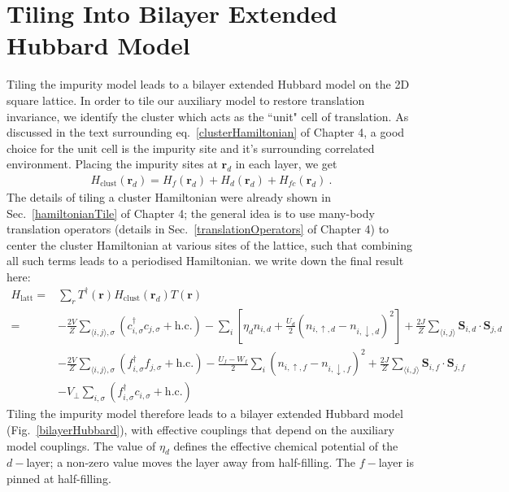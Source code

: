 \section{Tiling Into Bilayer Extended Hubbard Model}
Tiling the impurity model leads to a bilayer extended Hubbard model on the 2D square lattice. In order to tile our auxiliary model to restore translation invariance, we identify the cluster which acts as the ``unit" cell of translation. As discussed in the text surrounding eq.~\ref{clusterHamiltonian} of Chapter 4, a good choice for the unit cell is the impurity site and it's surrounding correlated environment. Placing the impurity sites at \(\bm r_d\) in each layer, we get
\begin{equation}\begin{aligned}
	H_\text{clust}(\bm r_d) = H_f(\bm r_d) + H_d(\bm r_d) + H_{fc}(\bm r_d)~.
\end{aligned}\end{equation}
The details of tiling a cluster Hamiltonian were already shown in Sec.~\ref{hamiltonianTile} of Chapter 4; the general idea is to use many-body translation operators (details in Sec.~\ref{translationOperators} of Chapter 4) to center the cluster Hamiltonian at various sites of the lattice, such that combining all such terms leads to a periodised Hamiltonian. we write down the final result here:
\begin{equation}\begin{aligned}
	H_\text{latt} =& \sum_r T^\dagger(\bm r) H_\text{clust}(\bm r_d) T(\bm r)\\
	=& -\frac{2V}{Z}\sum_{\langle i,j \rangle ,\sigma}\left(c^\dagger_{i,\sigma}c_{j,\sigma} + \text{h.c.}\right) - \sum_i \left[\eta_d n_{i,d} + \frac{U_d}{2}(n_{i,\uparrow,d} - n_{i,\downarrow,d})^2\right] + \frac{2J}{Z}\sum_{\langle i,j \rangle}{\bm S}_{i,d}\cdot{\bm S}_{j,d}\\
				   & -\frac{2V}{Z}\sum_{\langle i,j \rangle ,\sigma}\left(f^\dagger_{i,\sigma}f_{j,\sigma} + \text{h.c.}\right) - \frac{U_f - W_f}{2}\sum_i \left(n_{i,\uparrow,f} - n_{i,\downarrow,f}\right)^2 + \frac{2J}{Z} \sum_{\langle i,j \rangle}{\bm S}_{i,f}\cdot{\bm S}_{j,f}\\
				   & - V_\perp \sum_{i,\sigma}(f^\dagger_{i,\sigma} c_{i,\sigma} + \text{h.c.})
\end{aligned}\end{equation}
Tiling the impurity model therefore leads to a bilayer extended Hubbard model (Fig.~\ref{bilayerHubbard}), with effective couplings that depend on the auxiliary model couplings. The value of \(\eta_d\) defines the effective chemical potential of the \(d-\)layer; a non-zero value moves the layer away from half-filling. The \(f-\)layer is pinned at half-filling.


